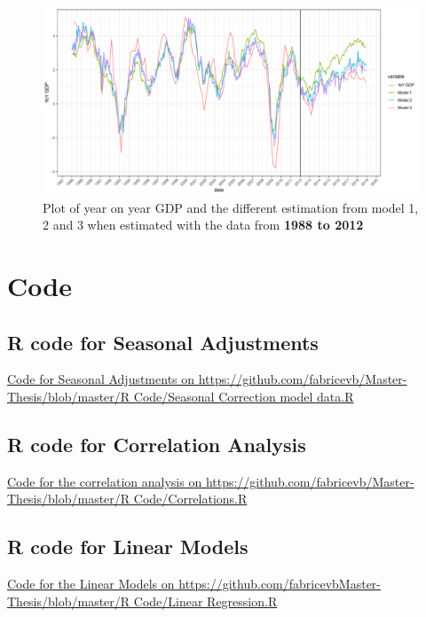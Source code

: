 \documentclass[12pt,a4paper,oneside]{book}
\begin{document}
\begin{figure}[H]
    \centering
    \includegraphics[scale=0.5]{Graphs/predictions3.pdf}
    \caption{Plot of year on year GDP and the different estimation from model 1, 2 and 3 when estimated with the data from \textbf{1988 to 2012}}
    \label{fig:predictions3}
\end{figure}



\chapter*{Code}
\section*{R code for Seasonal Adjustments}
\href{https://github.com/fabricevb/Master-Thesis/blob/master/R Code/Seasonal Correction model data.R}{Code for Seasonal Adjustments on https://github.com/fabricevb/Master-Thesis/blob/master/R Code/Seasonal Correction model data.R}


\section*{R code for Correlation Analysis}

\href{https://github.com/fabricevb/Master-Thesis/blob/master/R Code/Correlations.R}{Code for the correlation analysis on https://github.com/fabricevb/Master-Thesis/blob/master/R Code/Correlations.R}




\section*{R code for Linear Models}

\href{https://github.com/fabricevb/Master-Thesis/blob/master/R Code/Linear Regression.R}{Code for the Linear Models on https://github.com/fabricevbMaster-Thesis/blob/master/R Code/Linear Regression.R}
\end{document}
